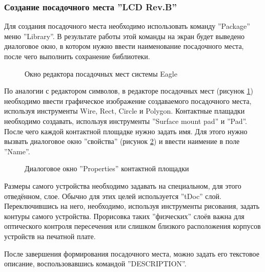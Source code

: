 \subsubsection{Создание посадочного места ''LCD Rev.B''}
\begin{par}
Для создания посадочного места необходимо использовать команду
''Pa\-cka\-ge'' меню ''Library''.
В результате работы этой команды на экран будет выведено диалоговое окно,
в котором нужно ввести наименование посадочного места, после чего
выполнить сохранение библиотеки.
\end{par}
\begin{figure}[ht]
	\caption{Окно редактора посадочных мест системы Eagle}
	\label{img:package}
\end{figure}

\begin{par}
По аналогии с редактором символов, в редакторе посадочных мест (рисунок \ref{img:package})
необходимо ввести графическое изображение создаваемого посадочного места,
используя инструменты Wire, Rect, Circle и Polygon. 
Контактные плащадки необходимо создавать, используя инструменты ''Surface mount pad'' и ''Pad''.
После чего каждой контактной площадке нужно задать имя. Для этого нужно вызвать диалоговое
окно ''свойства'' (рисунок \ref{img:padProperty})  и ввести наимение в поле ''Name''.
\end{par}
\begin{figure}[ht]
	\caption{Диалоговое окно ''Properties'' контактной площадки}
	\label{img:padProperty}
\end{figure}

Размеры самого устройства необходимо задавать на специальном, для этого отведённом, слое.
Обычно для этих целей используется ''tDoc'' слой. Переключившись на него, необходимо, используя
инструменты рисования, задать контуры самого устройства. Прорисовка таких ''физческих'' слоёв
важна для  оптического контроля пересечения или слишком близкого расположения корпусов
устройств на печатной плате.

После завершения формирования посадочного места, можно задать его текстовое описание,
воспользовавшись командой ''DESCRIPTION''.

